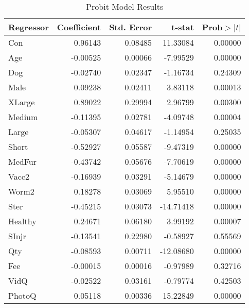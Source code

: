 \documentclass[12pt]{article}
\begin{document}
	\begin{table}[h]
		\centering
		\caption{Probit Model Results}
		\begin{tabular}{@{}lrrrr@{}}
			\toprule
			Regressor & Coefficient & Std. Error & t-stat    & Prob$ >|t| $ \\ \midrule
			Con       & 0.96143     & 0.08485    & 11.33084  & 0.00000  \\
			Age       & -0.00525    & 0.00066    & -7.99529  & 0.00000  \\
			Dog       & -0.02740    & 0.02347    & -1.16734  & 0.24309  \\
			Male      & 0.09238     & 0.02411    & 3.83118   & 0.00013  \\
			XLarge    & 0.89022     & 0.29994    & 2.96799   & 0.00300  \\
			Medium    & -0.11395    & 0.02781    & -4.09748  & 0.00004  \\
			Large     & -0.05307    & 0.04617    & -1.14954  & 0.25035  \\
			Short     & -0.52927    & 0.05587    & -9.47319  & 0.00000  \\
			MedFur    & -0.43742    & 0.05676    & -7.70619  & 0.00000  \\
			Vacc2     & -0.16939    & 0.03291    & -5.14679  & 0.00000  \\
			Worm2     & 0.18278     & 0.03069    & 5.95510   & 0.00000  \\
			Ster      & -0.45215    & 0.03073    & -14.71418 & 0.00000  \\
			Healthy   & 0.24671     & 0.06180    & 3.99192   & 0.00007  \\
			SInjr     & -0.13541    & 0.22980    & -0.58927  & 0.55569  \\
			Qty       & -0.08593    & 0.00711    & -12.08680 & 0.00000  \\
			Fee       & -0.00015    & 0.00016    & -0.97989  & 0.32716  \\
			VidQ      & -0.02522    & 0.03161    & -0.79774  & 0.42503  \\
			PhotoQ    & 0.05118     & 0.00336    & 15.22849  & 0.00000  \\ \bottomrule
		\end{tabular}
		\label{table:2}
	\end{table}
\end{document}
